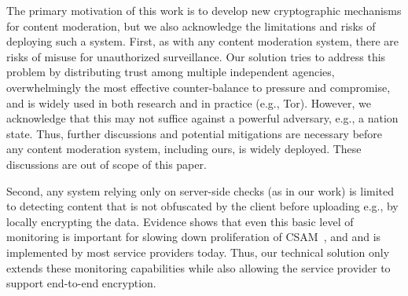 







%
The primary motivation of this work is to develop new cryptographic mechanisms for content moderation, but we also acknowledge the limitations and risks of deploying such a system. First, as with any content moderation system, there are risks of misuse for unauthorized surveillance. Our solution tries to address this problem by distributing trust among multiple independent agencies, overwhelmingly the most effective counter-balance to pressure and compromise, and is widely used in both research and in practice (e.g., Tor). However, we acknowledge that this may not suffice against a powerful adversary, e.g., a nation state. Thus, further discussions and potential mitigations are necessary before any content moderation system, including ours, is widely deployed. These discussions are out of scope of this paper.


Second, any system relying only on server-side checks (as in our work) is limited to detecting content that is not obfuscated by the client before uploading e.g., by locally encrypting the data. Evidence shows that even this basic level of monitoring is important for slowing down proliferation of CSAM~\cite{doj2020international}, and and is implemented by most service providers today. Thus, our technical solution only extends these monitoring capabilities while also allowing the service provider to support end-to-end encryption. 




 

